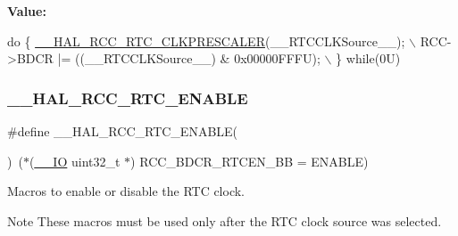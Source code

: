 {\bfseries Value\+:}
\begin{DoxyCode}
\textcolor{keywordflow}{do} \{ \mbox{\hyperlink{group___r_c_c___internal___r_t_c___clock___configuration_ga7e10e306e7d9f3cd59d30dcb2c9cf61d}{\_\_HAL\_RCC\_RTC\_CLKPRESCALER}}(\_\_RTCCLKSource\_\_);    \(\backslash\)
                                                    RCC->BDCR |= ((\_\_RTCCLKSource\_\_) & 0x00000FFFU);  \(\backslash\)
                                                   \} \textcolor{keywordflow}{while}(0U)
\end{DoxyCode}
\mbox{\label{group___r_c_c___internal___r_t_c___clock___configuration_gab7cc36427c31da645a0e38e181f8ce0f}} 
\subsubsection{\texorpdfstring{\+\_\+\+\_\+\+H\+A\+L\+\_\+\+R\+C\+C\+\_\+\+R\+T\+C\+\_\+\+E\+N\+A\+B\+LE}{\_\_HAL\_RCC\_RTC\_ENABLE}}
{\footnotesize\ttfamily \#define \+\_\+\+\_\+\+H\+A\+L\+\_\+\+R\+C\+C\+\_\+\+R\+T\+C\+\_\+\+E\+N\+A\+B\+LE(\begin{DoxyParamCaption}{ }\end{DoxyParamCaption})~($\ast$(\mbox{\hyperlink{core__sc300_8h_aec43007d9998a0a0e01faede4133d6be}{\+\_\+\+\_\+\+IO}} uint32\+\_\+t $\ast$) R\+C\+C\+\_\+\+B\+D\+C\+R\+\_\+\+R\+T\+C\+E\+N\+\_\+\+BB = E\+N\+A\+B\+LE)}



Macros to enable or disable the R\+TC clock. 

\begin{DoxyNote}{Note}
These macros must be used only after the R\+TC clock source was selected. 
\end{DoxyNote}
